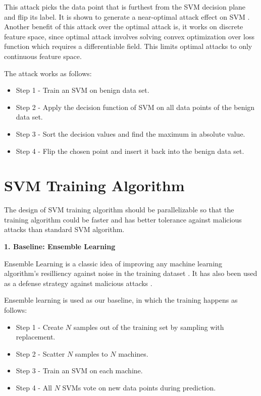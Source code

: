\documentclass[10pt,conference,compsocconf,letterpaper]{IEEEtran}
\begin{document}
This attack picks the data point that is furthest from the SVM decision plane and flip its label. It is shown to generate a near-optimal attack effect on SVM \cite{xiao12}. Another benefit of this attack over the optimal attack is, it works on discrete feature space, since optimal attack involves solving convex optimization over loss function which requires a differentiable field. This limits optimal attacks to only continuous feature space.

The attack works as follows:

\begin{itemize}
\item Step 1 - Train an SVM on benign data set.
\item Step 2 - Apply the decision function of SVM on all data points of the benign data set.
\item Step 3 - Sort the decision values and find the maximum in absolute value.
\item Step 4 - Flip the chosen point and insert it back into the benign data set.
\end{itemize}


\section{SVM Training Algorithm}

The design of SVM training algorithm should be parallelizable so that the training algorithm could be faster and has better tolerance against malicious attacks than standard SVM algorithm.

\textbf{1. Baseline: Ensemble Learning}

Ensemble Learning is a classic idea of improving any machine learning algorithm's resilliency against noise in the training dataset \cite{leo96, dong05}. It has also been used as a defense strategy against malicious attacks \cite{marco08, gabriela08}. 

Ensemble learning is used as our baseline, in which the training happens as follows:

\begin{itemize}
\item Step 1 - Create $N$ samples out of the training set by sampling with replacement.
\item Step 2 - Scatter $N$ samples to $N$ machines.
\item Step 3 - Train an SVM on each machine.
\item Step 4 - All $N$ SVMs vote on new data points during prediction.
\end{itemize}
\end{document}
